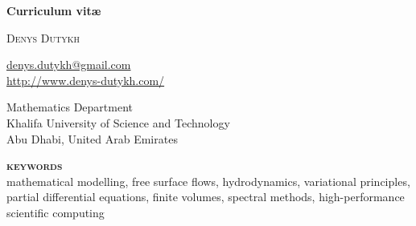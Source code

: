 \begin{titlepage}
    \vspace*{2cm}
    \begin{center}
        \Huge
        \textbf{Curriculum vit\ae} \\
    \end{center}
    \vspace*{2.7cm}
    \begin{center}
        \Large
        \textsc{Denys Dutykh}
    \end{center}
    \vspace*{0.5em}
    \begin{center}
        \large
        \href{mailto:denys.dutykh@gmail.com}{denys.dutykh@gmail.com} \\
        \url{http://www.denys-dutykh.com/}
    \end{center}
    \vspace*{0.5em}
    \begin{center}
        \large
        Mathematics Department \\
        Khalifa University of Science and Technology \\
        Abu Dhabi, United Arab Emirates
    \end{center}
    \vfill
    \begin{center}
        \textbf{\textsc{keywords}}\\[5mm]
        mathematical modelling, free surface flows, hydrodynamics, variational principles, partial differential equations, finite volumes, spectral methods, high-performance scientific computing
    \end{center}
\end{titlepage}